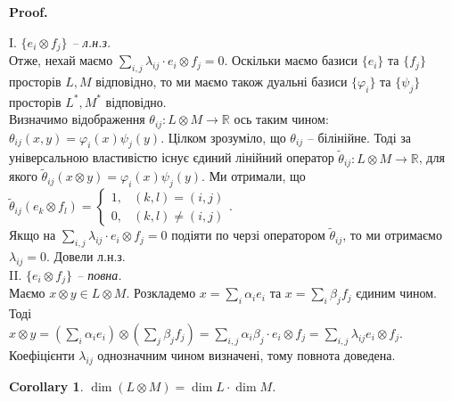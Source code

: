 \documentclass[a4paper, 10pt]{article}
\makeatletter
\theoremstyle{theoremdd}
\newtheorem{corollary}[theorem]{Corollary}
\renewenvironment{proof}[1][Proof.\\]{\par
\pushQED{\hfill \qed}%
\normalfont \topsep6\p@\@plus6\p@\relax
\trivlist
\item\relax
{\bfseries
#1\@addpunct{.}}\hspace\labelsep\ignorespaces
}{%
\popQED\endtrivlist\@endpefalse
}
\makeatother
\begin{document}
\begin{proof}
I. \textit{$\{e_i \otimes f_j\}$ -- л.н.з.}\\
Отже, нехай маємо $\displaystyle\sum_{i,j} \lambda_{ij} \cdot e_i \otimes f_j = 0$. Оскільки маємо базиси $\{e_i\}$ та $\{f_j\}$ просторів $L,M$ відповідно, то ми маємо також дуальні базиси $\{\varphi_i\}$ та $\{\psi_j\}$ просторів $L^*,M^*$ відповідно.\\
Визначимо відображення $\theta_{ij} \colon L \otimes M \to \mathbb{R}$ ось таким чином: $\theta_{ij}(x,y) = \varphi_i(x) \psi_j(y)$. Цілком зрозуміло, що $\theta_{ij}$ -- білінійне. Тоді за універсальною властивістю існує єдиний лінійний оператор $\tilde{\theta}_{ij} \colon L \otimes M \to \mathbb{R}$, для якого $\tilde{\theta}_{ij}(x \otimes y) = \varphi_i(x) \psi_j(y)$. Ми отримали, що $\tilde{\theta}_{ij}(e_k \otimes f_l) = \begin{cases} 1, & (k,l) = (i,j) \\ 0, & (k,l) \neq (i,j) \end{cases}$.\\
Якщо на $\displaystyle\sum_{i,j} \lambda_{ij} \cdot e_i \otimes f_j = 0$ подіяти по черзі оператором $\tilde{\theta}_{ij}$, то ми отримаємо $\lambda_{ij} = 0$. Довели л.н.з.
\bigskip \\
II. \textit{$\{e_i \otimes f_j\}$ -- повна.}\\
Маємо $x \otimes y \in L \otimes M$. Розкладемо $x = \displaystyle\sum_i \alpha_i e_i$ та $x = \displaystyle\sum_i \beta_j f_j$ єдиним чином. Тоді\\
$x \otimes y = \displaystyle\left(\sum_i \alpha_i e_i \right) \otimes \left(\sum_j \beta_j f_j \right) = \sum_{i,j} \alpha_i \beta_j \cdot e_i \otimes f_j = \sum_{i,j} \lambda_{ij} e_i \otimes f_j$.\\
Коефіцієнти $\lambda_{ij}$ однозначним чином визначені, тому повнота доведена.
\end{proof}

\begin{corollary}
$\dim (L \otimes M) = \dim L \cdot \dim M$.
\end{corollary}
\end{document}
